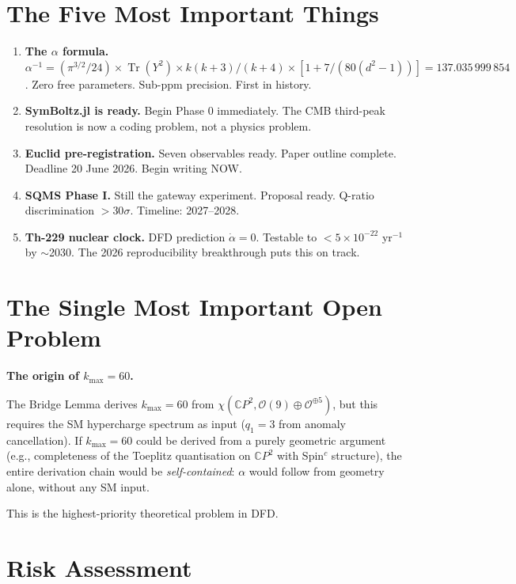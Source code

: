 \documentclass[11pt,a4paper]{article}
\newcommand{\Tr}{\operatorname{Tr}}
\newcommand{\CP}{\mathbb{C}P}
\begin{document}
\section{The Five Most Important Things}

\begin{enumerate}
\item \textbf{The $\alpha$ formula.} $\alpha^{-1} = (\pi^{3/2}/24) \times \Tr(Y^2) \times k(k+3)/(k+4) \times [1 + 7/(80(d^2-1))] = 137.035\,999\,854$. Zero free parameters. Sub-ppm precision. First in history.

\item \textbf{SymBoltz.jl is ready.} Begin Phase 0 immediately. The CMB third-peak resolution is now a coding problem, not a physics problem.

\item \textbf{Euclid pre-registration.} Seven observables ready. Paper outline complete. Deadline 20 June 2026. Begin writing NOW.

\item \textbf{SQMS Phase I.} Still the gateway experiment. Proposal ready. Q-ratio discrimination $> 30\sigma$. Timeline: 2027--2028.

\item \textbf{Th-229 nuclear clock.} DFD prediction $\dot{\alpha} = 0$. Testable to $< 5 \times 10^{-22}$ yr$^{-1}$ by $\sim$2030. The 2026 reproducibility breakthrough puts this on track.
\end{enumerate}

\section{The Single Most Important Open Problem}

\textbf{The origin of $k_{\max} = 60$.}

The Bridge Lemma derives $k_{\max} = 60$ from $\chi(\CP^2, \mathcal{O}(9) \oplus \mathcal{O}^{\oplus 5})$, but this requires the SM hypercharge spectrum as input ($q_1 = 3$ from anomaly cancellation). If $k_{\max} = 60$ could be derived from a purely geometric argument (e.g., completeness of the Toeplitz quantisation on $\CP^2$ with Spin$^c$ structure), the entire derivation chain would be \emph{self-contained}: $\alpha$ would follow from geometry alone, without any SM input.

This is the highest-priority theoretical problem in DFD.

\section{Risk Assessment}
\end{document}
